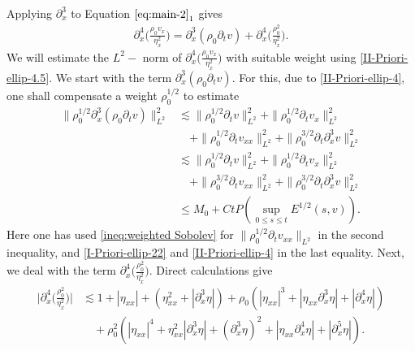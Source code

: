 \documentclass[11pt, reqno]{amsart}
\numberwithin{equation}{section}
\begin{document}
\bigskip
{} Applying \(\partial_x^3\) to Equation \(\eqref{eq:main-2}_1\) gives
\begin{equation}\label{II-Priori-ellip-4.5}
\begin{aligned}
\partial_x^4\bigg(\frac{\rho_0v_x}{\eta_x^2}\bigg)=\partial_x^3(\rho_0\partial_tv)
+\partial_x^4\bigg(\frac{\rho_0^2}{\eta_x^2}\bigg).
\end{aligned}
\end{equation}
We will estimate the \(L^2-\) norm of \(\partial_x^4\big(\frac{\rho_0v_x}{\eta_x^2}\big)\) with {suitable weight using \eqref{II-Priori-ellip-4.5}. We start with the term \(\partial_x^3(\rho_0\partial_tv)\). For this, due to \eqref{II-Priori-ellip-4}, one shall compensate a weight \(\rho_0^{1/2}\) to estimate
\begin{equation}\label{II-Priori-ellip-5}
\begin{aligned}
\|\rho_0^{1/2}\partial_x^3(\rho_0\partial_tv)\|_{L^2}^2
&\lesssim \|\rho_0^{1/2}\partial_tv\|_{L^2}^2+\|\rho_0^{1/2}\partial_tv_x\|_{L^2}^2\\
&\quad+\|\rho_0^{1/2}\partial_tv_{xx}\|_{L^2}^2
+\|\rho_0^{3/2}\partial_t\partial_x^3v\|_{L^2}^2\\
&\lesssim \|\rho_0^{1/2}\partial_tv\|_{L^2}^2+\|\rho_0^{1/2}\partial_tv_x\|_{L^2}^2\\
&\quad+\|\rho_0^{3/2}\partial_tv_{xx}\|_{L^2}^2
+\|\rho_0^{3/2}\partial_t\partial_x^3v\|_{L^2}^2\\
&\leq M_0+Ct P(\sup_{0\leq s\leq t}E^{1/2}(s,v)).
\end{aligned}
\end{equation}
Here one has used \eqref{ineq:weighted Sobolev} for \(\|\rho_0^{1/2}\partial_tv_{xx}\|_{L^2}\) in the second inequality, and \eqref{I-Priori-ellip-22} and \eqref{II-Priori-ellip-4} in the last equality.
Next, we deal with the term \(\partial_x^4\big({\frac{\rho_0^2}{\eta_x^2}}\big)\).
Direct calculations give
\begin{equation}\label{II-Priori-ellip-6}
\begin{aligned}
\bigg|\partial_x^4\bigg({\frac{\rho_0^2}{\eta_x^2}}\bigg)\bigg|
&\lesssim 1+|\eta_{xx}|+(\eta_{xx}^2+|\partial_x^3\eta|)
+\rho_0(|\eta_{xx}|^3+|\eta_{xx}\partial_x^3\eta|+|\partial_x^4\eta|)\\
&\quad+\rho_0^2(|\eta_{xx}|^4+\eta_{xx}^2|\partial_x^3\eta|+(\partial_x^3\eta)^2+|\eta_{xx}\partial_x^4\eta|+|\partial_x^5\eta|).
\end{aligned}
\end{equation}
}
\end{document}

